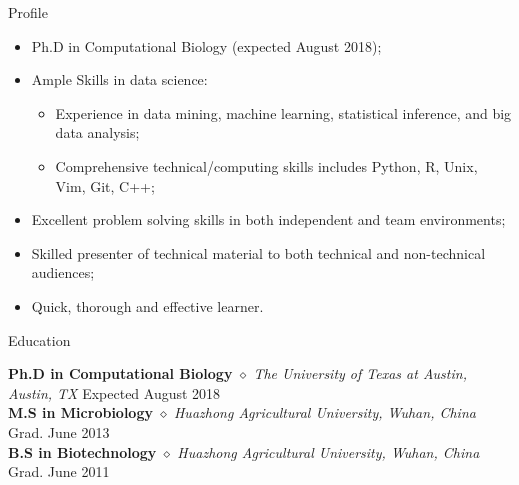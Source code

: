 \documentclass{my_resume} %
\begin{document}

\begin{rSection}{Profile}
\renewcommand\labelitemi{$\cdot$}
\begin{itemize}
  \item Ph.D in Computational Biology (expected August 2018);
  \vspace{-1.7em}\\
  \item Ample Skills in data science:
  \vspace{-1.7em}\\
    \begin{itemize}
      \item Experience in data mining, machine learning, statistical inference,
        and big data analysis;
      \vspace{-1.7em}\\
      \item Comprehensive technical/computing skills includes Python, R, Unix,
        Vim, Git, C++;
      \vspace{-1.7em}\\
    \end{itemize}
  \item Excellent problem solving skills in both independent and team
    environments;
  \vspace{-1.7em}\\
  \item Skilled presenter of technical material to both technical and
    non-technical audiences;
  \vspace{-1.7em}\\
  \item Quick, thorough and effective learner.
\end{itemize}
\end{rSection}


\begin{rSection}{Education}

{\bf Ph.D in Computational Biology} {$\diamond$} {\em The University of
Texas at Austin, Austin, TX} \hfill {Expected August 2018} \\
{\bf M.S in Microbiology} {$\diamond$} {\em Huazhong Agricultural University,
Wuhan, China} \hfill {Grad. June 2013} \\
{\bf B.S in Biotechnology} {$\diamond$} {\em Huazhong Agricultural University,
Wuhan, China} \hfill {Grad. June 2011}
\end{rSection}
\end{document}
